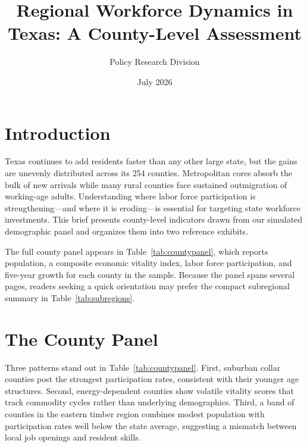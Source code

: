 \documentclass[11pt]{article}
\title{Regional Workforce Dynamics in Texas: A County-Level Assessment}
\author{Policy Research Division}
\date{July 2026}
\begin{document}
\maketitle

\section{Introduction}

Texas continues to add residents faster than any other large state, but the
gains are unevenly distributed across its 254 counties. Metropolitan cores
absorb the bulk of new arrivals while many rural counties face sustained
outmigration of working-age adults. Understanding where labor force
participation is strengthening---and where it is eroding---is essential for
targeting state workforce investments. This brief presents county-level
indicators drawn from our simulated demographic panel and organizes them into
two reference exhibits.

The full county panel appears in Table~\ref{tab:countypanel}, which reports
population, a composite economic vitality index, labor force participation,
and five-year growth for each county in the sample. Because the panel spans
several pages, readers seeking a quick orientation may prefer the compact
subregional summary in Table~\ref{tab:subregions}.

\section{The County Panel}

Three patterns stand out in Table~\ref{tab:countypanel}. First, suburban
collar counties post the strongest participation rates, consistent with their
younger age structures. Second, energy-dependent counties show volatile
vitality scores that track commodity cycles rather than underlying
demographics. Third, a band of counties in the eastern timber region combines
modest population with participation rates well below the state average,
suggesting a mismatch between local job openings and resident skills.
\end{document}

